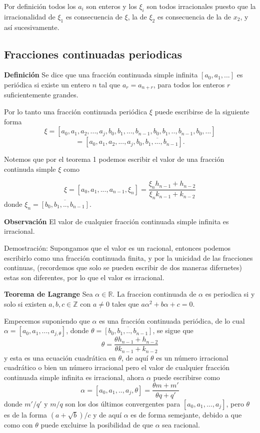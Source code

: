 \documentclass[11pt, article]{article}
\begin{document}
    Por definición todos los $a_i$ son enteros y los $\xi_i$ son todos irracionales puesto que la irracionalidad de $\xi_1$ es consecuencia de $\xi$, la de $\xi_2$ es consecuencia de la de $x_2$, y así sucesivamente.

    \subsection*{Fracciones continuadas periodicas}
    
    \textbf{Definición} Se dice que una fracción continuada simple infinita $[a_0,a_1,...]$ es periódica si existe un entero $n$ tal que $a_r=a_{n+r}$, para todos los enteros $r$ suficientemente grandes.
    
    Por lo tanto una fracción continuada periódica $\xi$ puede escribirse de la siguiente forma
        \[\xi=
        [a_0,a_1,a_2,...,a_j,b_0,b_1,...,b_{n-1},b_0,b_1,..,b_{n-1},b_{0},...]
        \]
        \[
        =[a_0,a_1,a_2,...,a_j,\overline{b_0,b_1,...,b_{n-1}}].
        \]
    
    Notemos que por el teorema 1 podemos escribir el valor de una fracción continuda simple $\xi$ como 

    \begin{equation}
    \xi=[a_0,a_1,...,a_{n-1},\xi_n]=\dfrac{\xi_n h_{n-1} + h_{n-2}}{\xi_n k_{n-1} + k_{n-2}}  \label{ecuacion_8}
    \end{equation}
    donde $\xi_n=\overline{[b_0,b_1,..,b_{n-1}]}$.
    
    \textbf{Observación} El valor de cualquier fracción continuada simple infinita es irracional.
    
    Demostración: Supongamos que el valor es un racional, entonces podemos escribirlo como una fracción continuada finita, y por la unicidad de las fracciones continuas, (recordemos que solo se pueden escribir de dos maneras difernetes)  estas son diferentes, por lo que el valor es irracional.
    
    

    \textbf{Teorema de Lagrange} Sea $\alpha \in \mathbb{R}$. La fraccion continuada de $\alpha$ es periodica si y solo si existen $a, b, c \in\mathbb{Z}$ con $a\not=0$ tales que $a\alpha^2 + b\alpha + c = 0$.

    Empecemos suponiendo que $\alpha$ es una fracción continuada periódica, de lo cual $\alpha= [a_0,a_1,...,a_{j,\theta}]$, donde $\theta=\overline{[b_0,b_1,..,b_{n-1}]}$, se sigue que
        \[
        \theta =\dfrac{\theta h_{n-1}+h_{n-2}}{\theta k_{n-1}+k_{n-2}}
        \]
    y esta es una ecuación cuadrática en $\theta$, de aquí $\theta$ es un número irracional cuadrático o bien un número irracional pero el valor de cualquier fracción continuada simple infinita es irracional, ahora $\alpha$ puede escribirse como 
        \[
        \alpha = [a_0,a_1,..,a_j,\theta]=\dfrac{\theta m + m'}{\theta q + q'}
        \]
    donde $m'/q'$ y $m/q$ son los dos últimos convergentes para $[a_0,a_1,...,a_j]$, pero $\theta$ es de la forma $(a + \sqrt{b})/c$ y de aquí $\alpha$ es de forma semejante, debido a que como con $\theta$ puede excluirse la posibilidad de que $\alpha$ sea racional.
\end{document}
